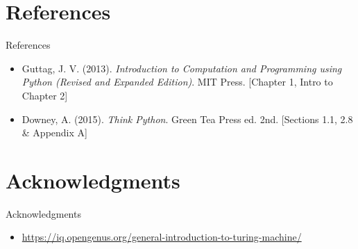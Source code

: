 \documentclass[t,handout,9pt]{beamer}
\begin{document}
\section{References}
\begin{frame}{References}
\begin{itemize}
	\item Guttag, J. V. (2013). \textit{Introduction to Computation and Programming using Python (Revised and Expanded Edition)}. MIT Press. [Chapter 1, Intro to Chapter 2]
	\item Downey, A. (2015). \textit{Think Python}. Green Tea Press ed. 2nd. [Sections 1.1, 2.8 \& Appendix A]
\end{itemize}
\end{frame}
\section{Acknowledgments}
\begin{frame}{Acknowledgments}
\begin{itemize}
	\item \url{https://iq.opengenus.org/general-introduction-to-turing-machine/}
\end{itemize}
\end{frame}
%

\end{document}
